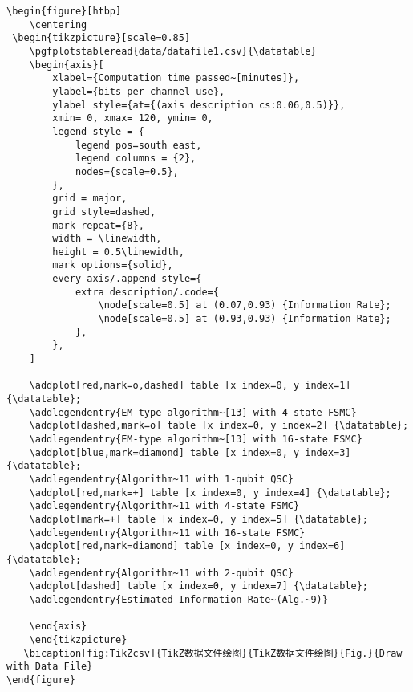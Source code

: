 {\wuhao
\begin{lstlisting}
\begin{figure}[htbp]
    \centering
 \begin{tikzpicture}[scale=0.85]
    \pgfplotstableread{data/datafile1.csv}{\datatable}
    \begin{axis}[
        xlabel={Computation time passed~[minutes]},
        ylabel={bits per channel use},
        ylabel style={at={(axis description cs:0.06,0.5)}},
        xmin= 0, xmax= 120, ymin= 0,
        legend style = {
            legend pos=south east,
            legend columns = {2},
            nodes={scale=0.5}, 
        },
        grid = major,
        grid style=dashed,
        mark repeat={8},
        width = \linewidth,
        height = 0.5\linewidth,
        mark options={solid},
        every axis/.append style={
            extra description/.code={
                \node[scale=0.5] at (0.07,0.93) {Information Rate};
                \node[scale=0.5] at (0.93,0.93) {Information Rate};
            },
        },
    ]

    \addplot[red,mark=o,dashed] table [x index=0, y index=1] {\datatable};
    \addlegendentry{EM-type algorithm~[13] with 4-state FSMC}
    \addplot[dashed,mark=o] table [x index=0, y index=2] {\datatable};
    \addlegendentry{EM-type algorithm~[13] with 16-state FSMC}
    \addplot[blue,mark=diamond] table [x index=0, y index=3] {\datatable};
    \addlegendentry{Algorithm~11 with 1-qubit QSC}
    \addplot[red,mark=+] table [x index=0, y index=4] {\datatable};
    \addlegendentry{Algorithm~11 with 4-state FSMC}
    \addplot[mark=+] table [x index=0, y index=5] {\datatable};
    \addlegendentry{Algorithm~11 with 16-state FSMC}
    \addplot[red,mark=diamond] table [x index=0, y index=6] {\datatable};
    \addlegendentry{Algorithm~11 with 2-qubit QSC}
    \addplot[dashed] table [x index=0, y index=7] {\datatable};
    \addlegendentry{Estimated Information Rate~(Alg.~9)}

    \end{axis}
    \end{tikzpicture}
   \bicaption[fig:TikZcsv]{TikZ数据文件绘图}{TikZ数据文件绘图}{Fig.}{Draw with Data File}
\end{figure}
\end{lstlisting}
}

